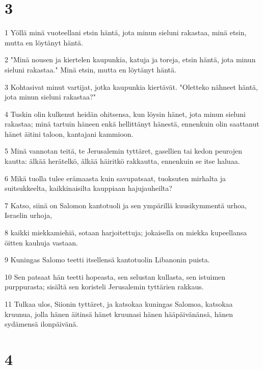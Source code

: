 \chapter{3}

\par 1 Yöllä minä vuoteellani etsin häntä, jota minun sieluni rakastaa, minä etsin, mutta en löytänyt häntä.
\par 2 "Minä nousen ja kiertelen kaupunkia, katuja ja toreja, etsin häntä, jota minun sieluni rakastaa." Minä etsin, mutta en löytänyt häntä.
\par 3 Kohtasivat minut vartijat, jotka kaupunkia kiertävät. "Oletteko nähneet häntä, jota minun sieluni rakastaa?"
\par 4 Tuskin olin kulkenut heidän ohitsensa, kun löysin hänet, jota minun sieluni rakastaa; minä tartuin häneen enkä hellittänyt hänestä, ennenkuin olin saattanut hänet äitini taloon, kantajani kammioon.
\par 5 Minä vannotan teitä, te Jerusalemin tyttäret, gasellien tai kedon peurojen kautta: älkää herätelkö, älkää häiritkö rakkautta, ennenkuin se itse haluaa.
\par 6 Mikä tuolla tulee erämaasta kuin savupatsaat, tuoksuten mirhalta ja suitsukkeelta, kaikkinaisilta kauppiaan hajujauheilta?
\par 7 Katso, siinä on Salomon kantotuoli ja sen ympärillä kuusikymmentä urhoa, Israelin urhoja,
\par 8 kaikki miekkamiehiä, sotaan harjoitettuja; jokaisella on miekka kupeellansa öitten kauhuja vastaan.
\par 9 Kuningas Salomo teetti itsellensä kantotuolin Libanonin puista.
\par 10 Sen patsaat hän teetti hopeasta, sen selustan kullasta, sen istuimen purppurasta; sisältä sen koristeli Jerusalemin tyttärien rakkaus.
\par 11 Tulkaa ulos, Siionin tyttäret, ja katsokaa kuningas Salomoa, katsokaa kruunua, jolla hänen äitinsä hänet kruunasi hänen hääpäivänänsä, hänen sydämensä ilonpäivänä.

\chapter{4}

